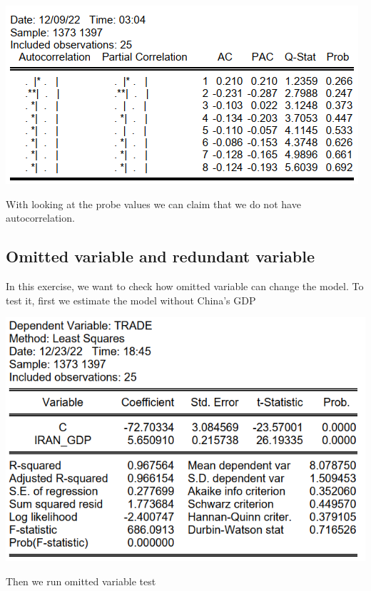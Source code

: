 \documentclass[12pt, letterpaper, twoside]{article}
\begin{document}
        \includegraphics[width=.6\textwidth,height=.6\textwidth,keepaspectratio,center]{20.png}
        
With looking at the probe values we can claim that we do not have autocorrelation.

\subsection{Omitted variable and redundant variable}

In this exercise, we want to check how omitted variable can change the model. To test it, first we estimate the model without China’s GDP

        \includegraphics[width=.6\textwidth,height=.6\textwidth,keepaspectratio,center]{21.png}
        
Then we run omitted variable test
\end{document}
